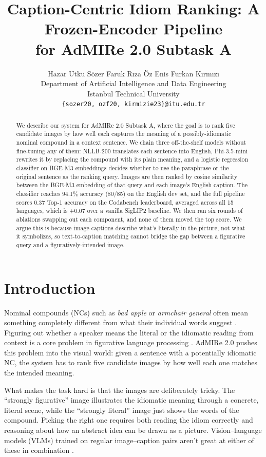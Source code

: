 \documentclass[11pt]{article}
\title{Caption-Centric Idiom Ranking: A Frozen-Encoder Pipeline\\
       for AdMIRe 2.0 Subtask A}
\author{
  Hazar Utku Sözer \quad Faruk Rıza Öz \quad Enis Furkan Kırmızı \\
  Department of Artificial Intelligence and Data Engineering \\
  Istanbul Technical University \\
  \texttt{\{sozer20, ozf20, kirmizie23\}@itu.edu.tr}
}
\begin{document}
\maketitle

\begin{abstract}
We describe our system for AdMIRe 2.0 Subtask A, where the goal is to rank five
candidate images by how well each captures the meaning of a possibly-idiomatic
nominal compound in a context sentence. We chain three off-the-shelf models
without fine-tuning any of them: NLLB-200 translates each sentence into English,
Phi-3.5-mini rewrites it by replacing the compound with its plain meaning, and a
logistic regression classifier on BGE-M3 embeddings decides whether to use the
paraphrase or the original sentence as the ranking query. Images are then ranked
by cosine similarity between the BGE-M3 embedding of that query and each image's
English caption. The classifier reaches 94.1\% accuracy (80/85) on the English
dev set, and the full pipeline scores 0.37 Top-1 accuracy on the Codabench
leaderboard, averaged across all 15 languages, which is +0.07 over a vanilla
SigLIP2 baseline. We then ran six rounds of ablations swapping out each
component, and none of them moved the top score. We argue this is because image
captions describe what's literally in the picture, not what it symbolizes, so
text-to-caption matching cannot bridge the gap between a figurative query and a
figuratively-intended image.
\end{abstract}

\section{Introduction}

Nominal compounds (NCs) such as \textit{bad apple} or \textit{armchair general}
often mean something completely different from what their individual words
suggest \cite{nunberg1994idioms,sag2002multiword}. Figuring out whether a
speaker means the literal or the idiomatic reading from context is a core
problem in figurative language processing \cite{tayyarmadabushi2022semeval}.
AdMIRe 2.0 \cite{admire2026} pushes this problem into the visual world: given
a sentence with a potentially idiomatic NC, the system has to rank five
candidate images by how well each one matches the intended meaning.

What makes the task hard is that the images are deliberately tricky. The
``strongly figurative'' image illustrates the idiomatic meaning through a
concrete, literal scene, while the ``strongly literal'' image just shows the
words of the compound. Picking the right one requires both reading the idiom
correctly and reasoning about how an abstract idea can be drawn as a picture.
Vision--language models (VLMs) trained on regular image--caption pairs aren't
great at either of these in combination
\cite{yuksekgonul2023aro,thrush2022winoground}.
\end{document}
